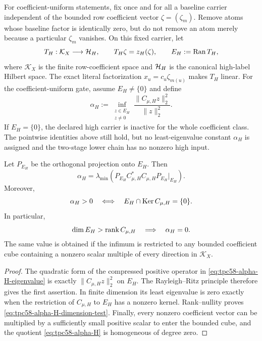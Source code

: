 For coefficient-uniform statements, fix once and for all a baseline
carrier independent of the bounded row coefficient vector
\(\zeta=(\zeta_m)\).  Remove atoms whose baseline factor is identically
zero, but do not remove an atom merely because a particular
\(\zeta_m\) vanishes.  On this fixed carrier, let
\begin{equation}
 T_H:\mathcal K_X\longrightarrow\mathcal H_H,
 \qquad
 T_H\zeta=z_H(\zeta),
 \qquad
 E_H:=\operatorname{Ran} T_H,
 \label{eq:tpc58-high-coefficient-map}
\end{equation}
where \(\mathcal K_X\) is the finite row-coefficient space and
\(\mathcal H_H\) is the canonical high-label Hilbert space.  The exact literal
factorization \(x_u=c_u\zeta_{m(u)}\) makes \(T_H\) linear.  For the
coefficient-uniform gate, assume \(E_H\ne\{0\}\) and define
\begin{equation}
 \alpha_H
 :=\inf_{\substack{z\in E_H\\z\ne0}}
 \frac{\|C_{\mu,H}z\|_2^2}{\|z\|_2^2}.
 \label{eq:tpc58-alpha-H}
\end{equation}
If \(E_H=\{0\}\), the declared high carrier is inactive for the whole
coefficient class.  The pointwise identities above still hold, but no
least-eigenvalue constant \(\alpha_H\) is assigned and the two-stage lower
chain has no nonzero high input.

\begin{proposition}
\label{prop:tpc58-optimal-high-transfer}
Let \(P_{E_H}\) be the orthogonal projection onto \(E_H\).  Then
\begin{equation}
 \boxed{
 \alpha_H
 =\lambda_{\min}\!\left(
 P_{E_H}C_{\mu,H}^{*}C_{\mu,H}P_{E_H}\big|_{E_H}
 \right).}
 \label{eq:tpc58-alpha-H-eigenvalue}
\end{equation}
Moreover,
\begin{equation}
 \alpha_H>0
 \quad\Longleftrightarrow\quad
 E_H\cap\operatorname{Ker} C_{\mu,H}=\{0\}.
 \label{eq:tpc58-alpha-H-kernel-test}
\end{equation}
In particular,
\begin{equation}
 \dim E_H>\operatorname{rank} C_{\mu,H}
 \quad\Longrightarrow\quad
 \alpha_H=0.
 \label{eq:tpc58-alpha-H-dimension-test}
\end{equation}
The same value is obtained if the infimum is restricted to any bounded
coefficient cube containing a nonzero scalar multiple of every direction
in \(\mathcal K_X\).
\end{proposition}

\begin{proof}
The quadratic form of the compressed positive operator in
\eqref{eq:tpc58-alpha-H-eigenvalue} is exactly
\(\|C_{\mu,H}z\|_2^2\) on \(E_H\).  The Rayleigh--Ritz principle therefore
gives the first assertion.  In finite dimension its least eigenvalue is
zero exactly when the restriction of \(C_{\mu,H}\) to \(E_H\) has a
nonzero kernel.  Rank--nullity proves
\eqref{eq:tpc58-alpha-H-dimension-test}.  Finally, every nonzero
coefficient vector can be multiplied by a sufficiently small positive
scalar to enter the bounded cube, and the quotient
\eqref{eq:tpc58-alpha-H} is homogeneous of degree zero.
\end{proof}

